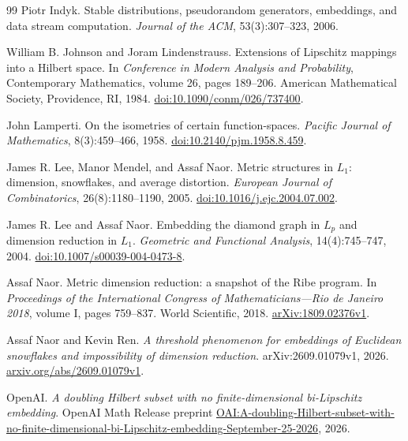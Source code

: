 \documentclass[11pt]{article}
\theoremstyle{remark}
\numberwithin{equation}{section}
\begin{document}
\begin{thebibliography}{99}
Piotr Indyk.
\newblock Stable distributions, pseudorandom generators, embeddings,
and data stream computation.
\newblock \emph{Journal of the ACM}, 53(3):307--323, 2006.

William B. Johnson and Joram Lindenstrauss.
\newblock Extensions of Lipschitz mappings into a Hilbert space.
\newblock In \emph{Conference in Modern Analysis and Probability},
Contemporary Mathematics, volume 26, pages 189--206.
American Mathematical Society, Providence, RI, 1984.
\newblock \href{https://doi.org/10.1090/conm/026/737400}
{doi:10.1090/conm/026/737400}.

John Lamperti.
\newblock On the isometries of certain function-spaces.
\newblock \emph{Pacific Journal of Mathematics}, 8(3):459--466, 1958.
\newblock \href{https://doi.org/10.2140/pjm.1958.8.459}
{doi:10.2140/pjm.1958.8.459}.

James R. Lee, Manor Mendel, and Assaf Naor.
\newblock Metric structures in $L_1$: dimension, snowflakes, and average
distortion.
\newblock \emph{European Journal of Combinatorics}, 26(8):1180--1190, 2005.
\newblock \href{https://doi.org/10.1016/j.ejc.2004.07.002}
{doi:10.1016/j.ejc.2004.07.002}.

James R. Lee and Assaf Naor.
\newblock Embedding the diamond graph in $L_p$ and dimension reduction
in $L_1$.
\newblock \emph{Geometric and Functional Analysis}, 14(4):745--747, 2004.
\newblock \href{https://doi.org/10.1007/s00039-004-0473-8}
{doi:10.1007/s00039-004-0473-8}.

Assaf Naor.
\newblock Metric dimension reduction: a snapshot of the Ribe program.
\newblock In \emph{Proceedings of the International Congress of
Mathematicians---Rio de Janeiro 2018}, volume I, pages 759--837.
World Scientific, 2018.
\newblock \href{https://arxiv.org/abs/1809.02376v1}{arXiv:1809.02376v1}.

Assaf Naor and Kevin Ren.
\newblock \emph{A threshold phenomenon for embeddings of Euclidean
snowflakes and impossibility of dimension reduction}.
\newblock arXiv:2609.01079v1, 2026.
\newblock \href{https://arxiv.org/abs/2609.01079v1}{arxiv.org/abs/2609.01079v1}.

OpenAI.
\newblock \emph{A doubling Hilbert subset with no finite-dimensional
bi-Lipschitz embedding}.
\newblock OpenAI Math Release preprint
\href{https://github.com/openai/math/blob/main/preprints/A-doubling-Hilbert-subset-with-no-finite-dimensional-bi-Lipschitz-embedding-September-25-2026/main.pdf}{OAI:A-doubling-Hilbert-subset-with-no-finite-dimensional-bi-Lipschitz-embedding-September-25-2026},
2026.


\end{thebibliography}
\end{document}
